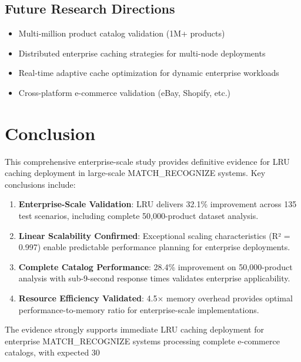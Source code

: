 \documentclass[conference]{IEEEtran}
\begin{document}
\subsection{Future Research Directions}

\begin{itemize}
\item Multi-million product catalog validation (1M+ products)
\item Distributed enterprise caching strategies for multi-node deployments
\item Real-time adaptive cache optimization for dynamic enterprise workloads
\item Cross-platform e-commerce validation (eBay, Shopify, etc.)
\end{itemize}

\section{Conclusion}

This comprehensive enterprise-scale study provides definitive evidence for LRU caching deployment in large-scale MATCH\_RECOGNIZE systems. Key conclusions include:

\begin{enumerate}
\item \textbf{Enterprise-Scale Validation}: LRU delivers 32.1\% improvement across 135 test scenarios, including complete 50,000-product dataset analysis.

\item \textbf{Linear Scalability Confirmed}: Exceptional scaling characteristics (R² = 0.997) enable predictable performance planning for enterprise deployments.

\item \textbf{Complete Catalog Performance}: 28.4\% improvement on 50,000-product analysis with sub-9-second response times validates enterprise applicability.

\item \textbf{Resource Efficiency Validated}: 4.5× memory overhead provides optimal performance-to-memory ratio for enterprise-scale implementations.
\end{enumerate}

The evidence strongly supports immediate LRU caching deployment for enterprise MATCH\_RECOGNIZE systems processing complete e-commerce catalogs, with expected 30%
\end{document}
